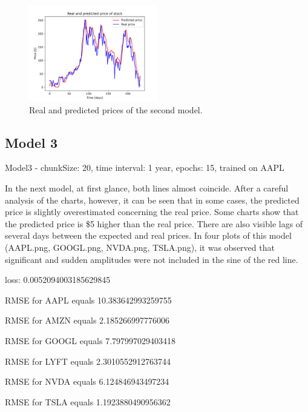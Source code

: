 \begin{figure}
\includegraphics[width=0.5\textwidth]{./graf/model2/TSLA.png}
\caption{Real and predicted prices of the second model.}
\label{fig:label}
\end{figure} 

\clearpage
\subsection{Model 3}

Model3 - chunkSize: 20, time interval: 1 year, epochs: 15, trained on AAPL\par\bigskip
In the next model, at first glance, both lines almost coincide. After a careful analysis of the charts,
however, it can be seen that in some cases, the predicted price is slightly overestimated concerning
the real price. Some charts show that the predicted price is {\$}5 higher than the real price.
There are also visible lags of several days between the expected and real prices. In four plots
of this model (AAPL.png, GOOGL.png, NVDA.png, TSLA.png), it was observed that significant and
sudden amplitudes were not included in the sine of the red line.
\par\bigskip
loss: 0.0052094003185629845\par
RMSE for AAPL equals 10.383642993259755\par
RMSE for AMZN equals 2.185266997776006\par
RMSE for GOOGL equals 7.797997029403418\par
RMSE for LYFT equals 2.3010552912763744\par
RMSE for NVDA equals 6.124846943497234\par
RMSE for TSLA equals 1.1923880490956362\par


